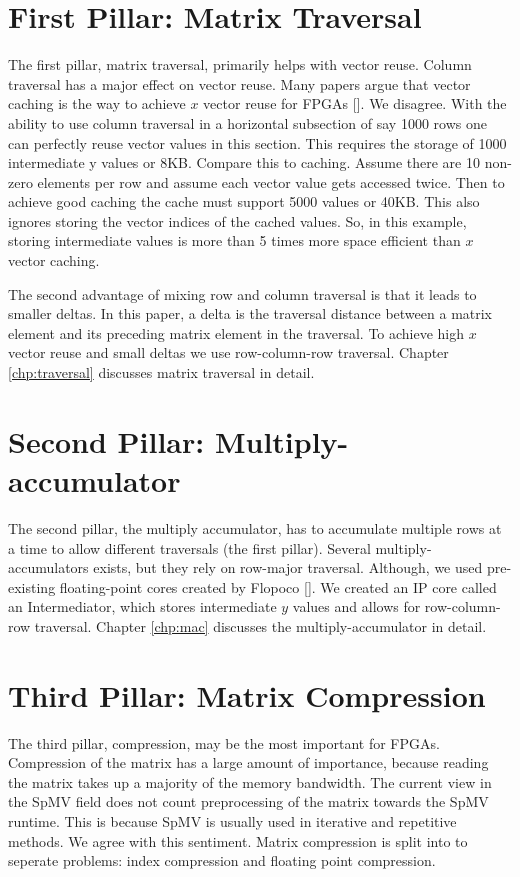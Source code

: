 \section{First Pillar: Matrix Traversal}
\par The first pillar, matrix traversal, primarily helps with vector reuse. Column traversal has a major effect on vector reuse. Many papers argue that vector caching is the way to achieve $x$ vector reuse for FPGAs [\cite{prelim:umuroglu, prelim:nagar1}]. We disagree. With the ability to use column traversal in a horizontal subsection of say 1000 rows one can perfectly reuse vector values in this section. This requires the storage of 1000 intermediate y values or 8KB. Compare this to caching. Assume there are 10 non-zero elements per row and assume each vector value gets accessed twice. Then to achieve good caching the cache must support 5000 values or 40KB. This also ignores storing the vector indices of the cached values. So, in this example, storing intermediate values is more than 5 times more space efficient than $x$ vector caching.
\par The second advantage of mixing row and column traversal is that it leads to smaller deltas. In this paper, a delta is the traversal distance between a matrix element and its preceding matrix element in the traversal. To achieve high $x$ vector reuse and small deltas we use row-column-row traversal. Chapter \ref{chp:traversal} discusses matrix traversal in detail.

\section{Second Pillar: Multiply-accumulator}

\par The second pillar, the multiply accumulator, has to accumulate multiple rows at a time to allow different traversals (the first pillar). Several multiply-accumulators exists, but they rely on row-major traversal. Although, we used pre-existing floating-point cores created by Flopoco [\cite{prelim:dedinechin}]. We created an IP core called an Intermediator, which stores intermediate $y$ values and allows for row-column-row traversal. Chapter \ref{chp:mac} discusses the multiply-accumulator in detail.

\section{Third Pillar: Matrix Compression}
\par The third pillar, compression, may be the most important for FPGAs. Compression of the matrix has a large amount of importance, because reading the matrix takes up a majority of the memory bandwidth. The current view in the SpMV field does not count preprocessing of the matrix towards the SpMV runtime. This is because SpMV is usually used in iterative and repetitive methods. We agree with this sentiment. Matrix compression is split into to seperate problems: index compression and floating point compression.
